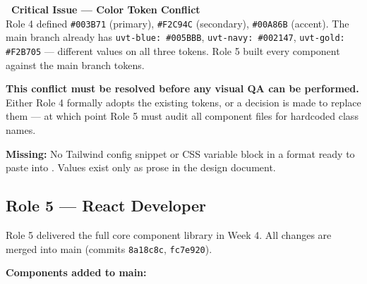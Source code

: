 \documentclass[12pt,a4paper]{article}
\begin{document}
\vspace{0.8em}

\begin{yellowbox}
\textbf{\color{uvtDarkBlue}\faExclamationTriangle\ Critical Issue --- Color Token Conflict}\\[6pt]
\color{textGray}
Role 4 defined \texttt{\#003B71} (primary), \texttt{\#F2C94C} (secondary),
\texttt{\#00A86B} (accent). The main branch  already has
\texttt{uvt-blue: \#005BBB}, \texttt{uvt-navy: \#002147},
\texttt{uvt-gold: \#F2B705} --- different values on all three tokens.
Role 5 built every component against the main branch tokens.

\vspace{4pt}
\textbf{This conflict must be resolved before any visual QA can be performed.}
Either Role 4 formally adopts the existing tokens, or a decision is made to
replace them --- at which point Role 5 must audit all component files for
hardcoded class names.
\end{yellowbox}

\vspace{0.8em}

\textbf{Missing:} No Tailwind config snippet or CSS variable block in a
format ready to paste into . Values exist only as prose in
the design document.

\subsection{Role 5 --- React Developer}

Role 5 delivered the full core component library in Week 4. All changes are
merged into main (commits \texttt{8a18c8c}, \texttt{fc7e920}).

\vspace{0.8em}
\noindent\textbf{Components added to main:}
\vspace{0.4em}
\end{document}
